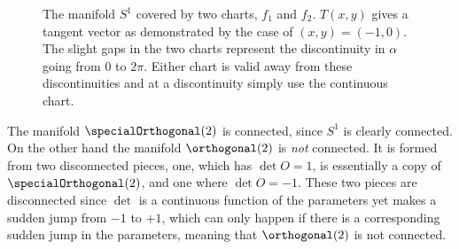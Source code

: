 \documentclass[fleqn]{NotesClass}
\begin{document}
    \begin{figure}
        \caption[The manifold \(S^1\)]{The manifold \(S^1\) covered by two charts, \(f_1\) and \(f_2\). \(T(x, y)\) gives a tangent vector as demonstrated by the case of \((x, y) = (-1, 0)\). The slight gaps in the two charts represent the discontinuity in \(\alpha\) going from 0 to \(2\pi\). Either chart is valid away from these discontinuities and at a discontinuity simply use the continuous chart.}
    \end{figure}
    
    The manifold \(\specialOrthogonal(2)\) is connected, since \(S^1\) is clearly connected.
    On the other hand the manifold \(\orthogonal(2)\) is \emph{not} connected.
    It is formed from two disconnected pieces, one, which has \(\det O = 1\), is essentially a copy of \(\specialOrthogonal(2)\), and one where \(\det O = -1\).
    These two pieces are disconnected since \(\det\) is a continuous function of the parameters yet makes a sudden jump from \(-1\) to \(+1\), which can only happen if there is a corresponding sudden jump in the parameters, meaning that \(\orthogonal(2)\) is not connected.
    
\end{document}
